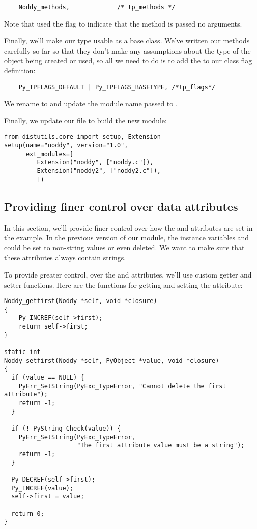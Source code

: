 \begin{verbatim}
    Noddy_methods,             /* tp_methods */
\end{verbatim}

Note that used the  flag to indicate that the
method is passed no arguments.

Finally, we'll make our type usable as a base class.  We've written
our methods carefully so far so that they don't make any assumptions
about the type of the object being created or used, so all we need to
do is to add the  to our class flag
definition:

\begin{verbatim}
    Py_TPFLAGS_DEFAULT | Py_TPFLAGS_BASETYPE, /*tp_flags*/
\end{verbatim}

We rename  to 
and update the module name passed to .

Finally, we update our  file to build the new module:

\begin{verbatim}
from distutils.core import setup, Extension
setup(name="noddy", version="1.0",
      ext_modules=[
         Extension("noddy", ["noddy.c"]),
         Extension("noddy2", ["noddy2.c"]),
         ])
\end{verbatim}

\subsection{Providing finer control over data attributes}

In this section, we'll provide finer control over how the
 and  attributes are set in the
 example. In the previous version of our module, the
instance variables  and  could be set to
non-string values or even deleted. We want to make sure that these
attributes always contain strings.



To provide greater control, over the  and 
attributes, we'll use custom getter and setter functions.  Here are
the functions for getting and setting the  attribute:

\begin{verbatim}
Noddy_getfirst(Noddy *self, void *closure)
{
    Py_INCREF(self->first);
    return self->first;
}

static int
Noddy_setfirst(Noddy *self, PyObject *value, void *closure)
{
  if (value == NULL) {
    PyErr_SetString(PyExc_TypeError, "Cannot delete the first attribute");
    return -1;
  }
  
  if (! PyString_Check(value)) {
    PyErr_SetString(PyExc_TypeError, 
                    "The first attribute value must be a string");
    return -1;
  }
      
  Py_DECREF(self->first);
  Py_INCREF(value);
  self->first = value;    

  return 0;
}
\end{verbatim}

